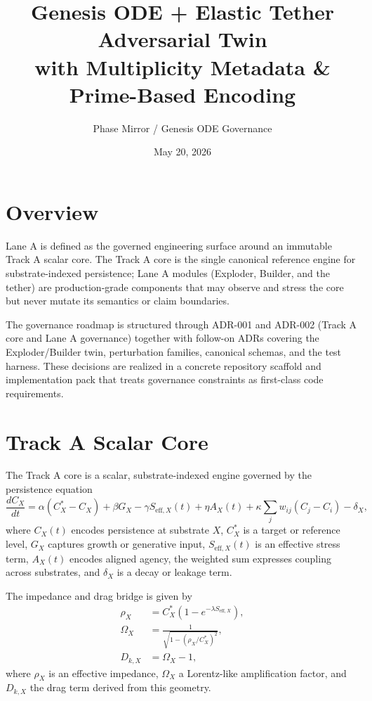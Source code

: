 \documentclass[11pt]{article}
\title{Genesis ODE + Elastic Tether Adversarial Twin \\ with Multiplicity Metadata \& Prime-Based Encoding}
\author{Phase Mirror / Genesis ODE Governance}
\date{May 20, 2026}
\begin{document}
\maketitle

\section{Overview}

Lane A is defined as the governed engineering surface around an immutable Track A scalar core. The Track A core is the single canonical reference engine for substrate-indexed persistence; Lane A modules (Exploder, Builder, and the tether) are production-grade components that may observe and stress the core but never mutate its semantics or claim boundaries.

The governance roadmap is structured through ADR-001 and ADR-002 (Track A core and Lane A governance) together with follow-on ADRs covering the Exploder/Builder twin, perturbation families, canonical schemas, and the test harness. These decisions are realized in a concrete repository scaffold and implementation pack that treats governance constraints as first-class code requirements.

\section{Track A Scalar Core}

The Track A core is a scalar, substrate-indexed engine governed by the persistence equation
\begin{equation}
\frac{dC_X}{dt}
= \alpha (C_X^* - C_X)
+ \beta G_X
- \gamma S_{\mathrm{eff},X}(t)
+ \eta A_X(t)
+ \kappa \sum_j w_{ij}(C_j - C_i)
- \delta_X,
\end{equation}
where \(C_X(t)\) encodes persistence at substrate \(X\), \(C_X^*\) is a target or reference level, \(G_X\) captures growth or generative input, \(S_{\mathrm{eff},X}(t)\) is an effective stress term, \(A_X(t)\) encodes aligned agency, the weighted sum expresses coupling across substrates, and \(\delta_X\) is a decay or leakage term.

The impedance and drag bridge is given by
\begin{align}
\rho_X &= C_X^* \left(1 - e^{-\lambda S_{\mathrm{eff},X}}\right), \\
\Omega_X &= \frac{1}{\sqrt{1 - (\rho_X / C_X^*)^2}}, \\
D_{k,X} &= \Omega_X - 1,
\end{align}
where \(\rho_X\) is an effective impedance, \(\Omega_X\) a Lorentz-like amplification factor, and \(D_{k,X}\) the drag term derived from this geometry.
\end{document}
